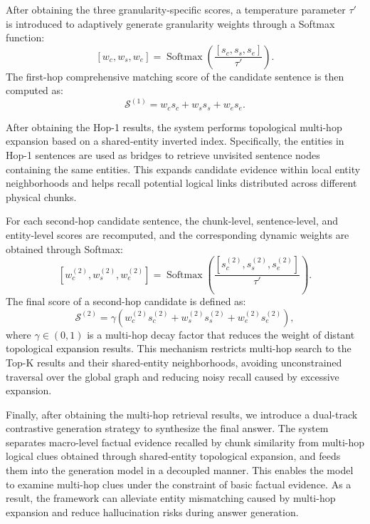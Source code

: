 \documentclass[preprint,12pt]{elsarticle}
\begin{document}
After obtaining the three granularity-specific scores, a temperature parameter $\tau'$ is introduced to adaptively generate granularity weights through a Softmax function:
\[
[w_{c},w_{s},w_{e}]
=
\operatorname{Softmax}
\left(
\frac{[s_{c},s_{s},s_{e}]}{\tau'}
\right).
\]
The first-hop comprehensive matching score of the candidate sentence is then computed as:
\[
\mathcal{S}^{(1)}
=
w_{c}s_{c}
+
w_{s}s_{s}
+
w_{e}s_{e}.
\]

After obtaining the Hop-1 results, the system performs topological multi-hop expansion based on a shared-entity inverted index. Specifically, the entities in Hop-1 sentences are used as bridges to retrieve unvisited sentence nodes containing the same entities. This expands candidate evidence within local entity neighborhoods and helps recall potential logical links distributed across different physical chunks.

For each second-hop candidate sentence, the chunk-level, sentence-level, and entity-level scores are recomputed, and the corresponding dynamic weights are obtained through Softmax:
\[
[w_{c}^{(2)},w_{s}^{(2)},w_{e}^{(2)}]
=
\operatorname{Softmax}
\left(
\frac{[s_{c}^{(2)},s_{s}^{(2)},s_{e}^{(2)}]}{\tau'}
\right).
\]
The final score of a second-hop candidate is defined as:
\[
\mathcal{S}^{(2)}
=
\gamma
\left(
w_{c}^{(2)}s_{c}^{(2)}
+
w_{s}^{(2)}s_{s}^{(2)}
+
w_{e}^{(2)}s_{e}^{(2)}
\right),
\]
where $\gamma \in (0,1)$ is a multi-hop decay factor that reduces the weight of distant topological expansion results. This mechanism restricts multi-hop search to the Top-K results and their shared-entity neighborhoods, avoiding unconstrained traversal over the global graph and reducing noisy recall caused by excessive expansion.

Finally, after obtaining the multi-hop retrieval results, we introduce a dual-track contrastive generation strategy to synthesize the final answer. The system separates macro-level factual evidence recalled by chunk similarity from multi-hop logical clues obtained through shared-entity topological expansion, and feeds them into the generation model in a decoupled manner. This enables the model to examine multi-hop clues under the constraint of basic factual evidence. As a result, the framework can alleviate entity mismatching caused by multi-hop expansion and reduce hallucination risks during answer generation.

\end{document}
